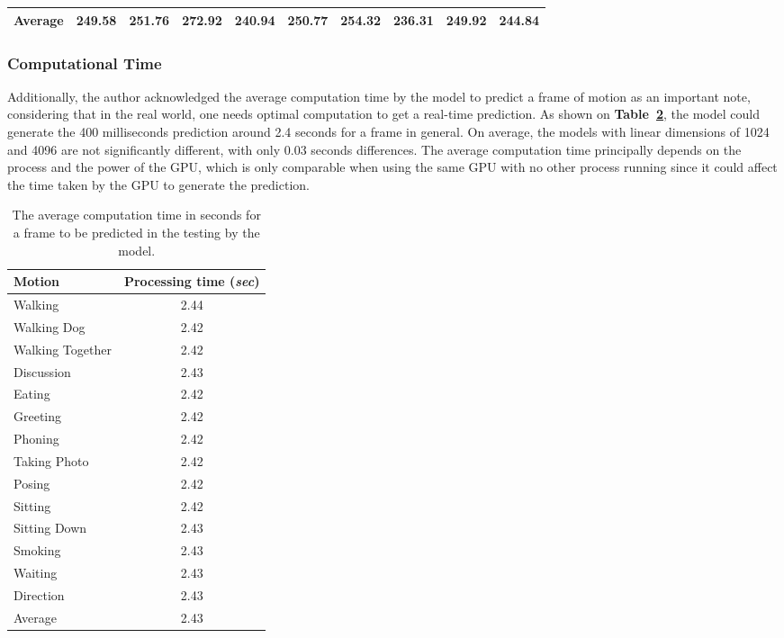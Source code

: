 \begin{table}
{\begin{tabular}{l|rrr|rrr|rrr}
        \midrule
        Average	&	249.58	&	251.76	&	272.92	&	240.94	&	250.77	&	254.32	&	\textbf{236.31}	&	249.92	&	244.84 \\
        \bottomrule
    \end{tabular}}
    \label{tbl:2DMPJPE_3dpw}
\end{table}


\subsubsection{Computational Time}
Additionally, the author acknowledged the average computation time by the model to predict a frame of motion as an important note, considering that in the real world, one needs optimal computation to get a real-time prediction.
As shown on \textbf{Table~\ref{tbl:2Dcomputationtime}}, the model could generate the 400 milliseconds prediction around 2.4 seconds for a frame in general.
On average, the models with linear dimensions of 1024 and 4096 are not significantly different, with only 0.03 seconds differences.
The average computation time principally depends on the process and the power of the GPU, which is only comparable when using the same GPU with no other process running since it could affect the time taken by the GPU to generate the prediction.

\begin{table}
    \centering
    \caption{The average computation time in seconds for a frame to be predicted in the testing by the model.}
    \begin{tabular}[t]{l|c}
        \toprule
        Motion              & Processing time (\textit{sec})\\
        \midrule
        Walking             & 2.44\\
        Walking Dog         & 2.42\\
        Walking Together    & 2.42\\
        Discussion          & 2.43\\
        Eating              & 2.42\\
        Greeting            & 2.42\\
        Phoning             & 2.42\\
        Taking Photo        & 2.42\\
        Posing              & 2.42\\
        Sitting             & 2.42\\
        Sitting Down        & 2.43\\
        Smoking             & 2.43\\
        Waiting             & 2.43\\
        Direction           & 2.43\\
        \midrule
        Average             & 2.43\\
        \bottomrule
    \end{tabular}
    \label{tbl:2Dcomputationtime}
\end{table} 


